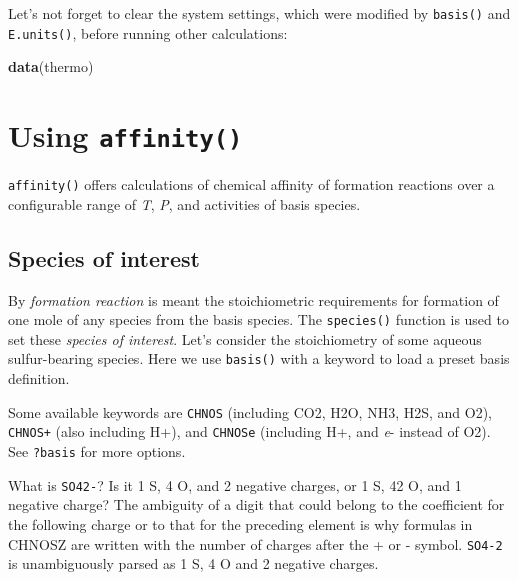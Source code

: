 \documentclass[]{tufte-handout}
\newenvironment{Shaded}{}{}
\newcommand{\KeywordTok}[1]{\textcolor[rgb]{0.00,0.44,0.13}{\textbf{#1}}}
\newcommand{\NormalTok}[1]{#1}
\begin{document}
Let's not forget to clear the system settings, which were modified by
{\texttt{basis()}} and {\texttt{E.units()}}, before running other
calculations:

\begin{Shaded}
\begin{Highlighting}[]
\KeywordTok{data}\NormalTok{(thermo)}
\end{Highlighting}
\end{Shaded}

\section{\texorpdfstring{Using
{\texttt{affinity()}}}{Using affinity()}}\label{using-affinity}

{\texttt{affinity()}} offers calculations of chemical affinity of
formation reactions over a configurable range of \emph{T}, \emph{P}, and
activities of basis species.

\hypertarget{species-of-interest}{\subsection{Species of
interest}\label{species-of-interest}}

By \emph{formation reaction} is meant the stoichiometric requirements
for formation of one mole of any species from the basis species. The
{\texttt{species()}} function is used to set these \emph{species of
interest}. Let's consider the stoichiometry of some aqueous
sulfur-bearing species. Here we use {\texttt{basis()}} with a keyword to
load a preset basis definition.

\begin{marginfigure}
Some available keywords are \texttt{CHNOS} (including CO2, H2O, NH3,
H2S, and O2), \texttt{CHNOS+} (also including H+), and \texttt{CHNOSe}
(including H+, and \emph{e}- instead of O2). See {\texttt{?basis}} for
more options.
\end{marginfigure}\begin{marginfigure}
What is \texttt{SO42-}? Is it 1 S, 4 O, and 2 negative charges, or 1 S,
42 O, and 1 negative charge? The ambiguity of a digit that could belong
to the coefficient for the following charge or to that for the preceding
element is why formulas in CHNOSZ are written with the number of charges
after the + or - symbol. \texttt{SO4-2} is unambiguously parsed as 1 S,
4 O and 2 negative charges.
\end{marginfigure}
\end{document}
